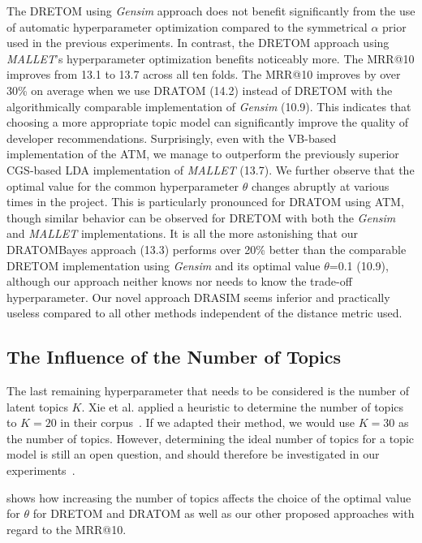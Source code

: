 \documentclass[a4paper,twoside]{article}
\begin{document}
The \ac{DRETOM} using \textit{Gensim} approach does not benefit significantly from the use of automatic hyperparameter optimization compared to the symmetrical $\alpha$ prior used in the previous experiments.
In contrast, the \ac{DRETOM} approach using \textit{MALLET}'s hyperparameter optimization benefits noticeably more.
The \ac{MRR}@10 improves from 13.1 to 13.7 across all ten folds.
The \ac{MRR}@10 improves by over 30\% on average when we use \ac{DRATOM} (14.2) instead of \ac{DRETOM} with the algorithmically comparable implementation of \textit{Gensim} (10.9).
This indicates that choosing a more appropriate topic model can significantly improve the quality of developer recommendations.
Surprisingly, even with the \ac{VB}-based implementation of the \ac{ATM}, we manage to outperform the previously superior \ac{CGS}-based \ac{LDA} implementation of \textit{MALLET} (13.7). 
We further observe that the optimal value for the common hyperparameter $\theta$ changes abruptly at various times in the project.
This is particularly pronounced for \ac{DRATOM} using \ac{ATM},
though similar behavior can be observed for \ac{DRETOM} with both the \textit{Gensim} and \textit{MALLET} implementations.
It is all the more astonishing that our \ac{DRATOMBayes} approach (13.3) performs over 20\% better than the comparable \ac{DRETOM} implementation using \textit{Gensim} and its optimal value $\theta$=0.1 (10.9), although our approach neither knows nor needs to know the trade-off hyperparameter.
Our novel approach \ac{DRASIM} seems inferior and practically useless compared to all other methods independent of the distance metric used.

\subsection{The Influence of the Number of Topics}
\label{sec:exp6}


The last remaining hyperparameter that needs to be considered is the number of latent topics $K$.
Xie et al. applied a heuristic to determine the number of topics to $K=20$ in their corpus~\cite{xie2012dretom}.
If we adapted their method, we would use $K=30$ as the number of topics.
However, determining the ideal number of topics for a topic model is still an open question, and should therefore be investigated in our experiments~\cite{Hasan2021NumTopics}.

 shows how increasing the number of topics affects the choice of the optimal value for $\theta$ for \ac{DRETOM} and \ac{DRATOM} as well as our other proposed approaches with regard to the \ac{MRR}@10.
\end{document}
